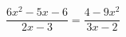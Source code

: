 \begin{ex}[type=equation]
	\begin{condition}
		$\dfrac{6x^2 - 5x - 6}{2x - 3} = \dfrac{4-9x^2}{3x - 2}$
	\end{condition}
\end{ex}
